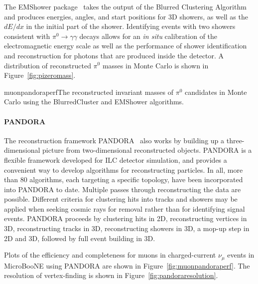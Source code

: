 The EMShower package~\cite{emshowerpackage} takes the output of the
Blurred Clustering Algorithm and
produces energies, angles, and start positions for 3D showers, as
well as the $dE/dx$ in the initial part of the shower.  Identifying
events with two showers consistent with $\pi^0\rightarrow\gamma\gamma$
decays allows for an {\it in situ} calibration of the electromagnetic
energy scale as well as the performance of shower identification and
reconstruction for photons that are produced inside the detector.  A
distribution of reconstructed $\pi^0$ masses in Monte Carlo is shown
in Figure~\ref{fig:pizeromass}.

\begin{cdrfigure}{muonpandoraperf}{The reconstructed invariant masses of $\pi^0$ candidates in
  Monte Carlo using the BlurredCluster and EMShower algorithms.}
\end{cdrfigure}


\paragraph{PANDORA}
The reconstruction framework PANDORA~\cite{pandora} also works by
building up a three-dimensional picture from two-dimensional
reconstructed objects.  PANDORA is a flexible framework developed for
ILC detector simulation, and provides a convenient way to develop
algorithms for reconstructing particles.  In all, more than 80
algorithms, each targeting a specific topology, have been incorporated
into PANDORA to date.  Multiple passes through reconstructing the data
are possible.  Different criteria for clustering hits into tracks and
showers may be applied when seeking cosmic rays for removal rather than for
identifying signal events.  PANDORA proceeds by clustering hits in 2D,
reconstructing vertices in 3D, reconstructing tracks in 3D,
reconstructing showers in 3D, a mop-up step in 2D and 3D, followed by
full event building in 3D.

Plots of the efficiency and completeness for muons in charged-current $\nu_{\mu}$
events in MicroBooNE using PANDORA are shown in Figure~\ref{fig:muonpandoraperf}.
The resolution of vertex-finding is shown in
Figure~\ref{fig:pandoraresolution}.

